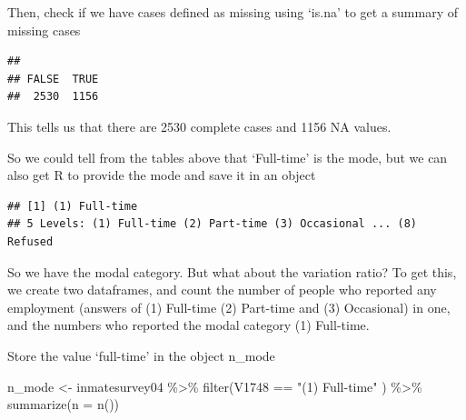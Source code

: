 \documentclass[
]{book}
\newenvironment{Shaded}{\begin{snugshade}}{\end{snugshade}}
\newcommand{\AttributeTok}[1]{\textcolor[rgb]{0.77,0.63,0.00}{#1}}
\newcommand{\ConstantTok}[1]{\textcolor[rgb]{0.00,0.00,0.00}{#1}}
\newcommand{\FunctionTok}[1]{\textcolor[rgb]{0.00,0.00,0.00}{#1}}
\newcommand{\NormalTok}[1]{#1}
\newcommand{\OtherTok}[1]{\textcolor[rgb]{0.56,0.35,0.01}{#1}}
\newcommand{\SpecialCharTok}[1]{\textcolor[rgb]{0.00,0.00,0.00}{#1}}
\newcommand{\StringTok}[1]{\textcolor[rgb]{0.31,0.60,0.02}{#1}}
\begin{document}
\begin{Shaded}
\end{Shaded}

Then, check if we have cases defined as missing using `is.na' to get a summary of missing cases

\begin{Shaded}
\end{Shaded}

\begin{verbatim}
## 
## FALSE  TRUE 
##  2530  1156
\end{verbatim}

This tells us that there are 2530 complete cases and 1156 NA values.

So we could tell from the tables above that `Full-time' is the mode, but we can also get R to provide the mode and save it in an object

\begin{Shaded}
\end{Shaded}

\begin{verbatim}
## [1] (1) Full-time
## 5 Levels: (1) Full-time (2) Part-time (3) Occasional ... (8) Refused
\end{verbatim}

So we have the modal category. But what about the variation ratio? To get this, we create two dataframes, and count the number of people who reported any employment (answers of (1) Full-time (2) Part-time and (3) Occasional) in one, and the numbers who reported the modal category (1) Full-time.

Store the value `full-time' in the object n\_mode

\begin{Shaded}
\begin{Highlighting}[]
\NormalTok{n\_mode }\OtherTok{\textless{}{-}}\NormalTok{ inmatesurvey04 }\SpecialCharTok{\%\textgreater{}\%} 
  \FunctionTok{filter}\NormalTok{(V1748 }\SpecialCharTok{==} \StringTok{"(1) Full{-}time"}\NormalTok{ ) }\SpecialCharTok{\%\textgreater{}\%} 
  \FunctionTok{summarize}\NormalTok{(}\AttributeTok{n =} \FunctionTok{n}\NormalTok{()) }
\end{Highlighting}
\end{Shaded}
\end{document}
